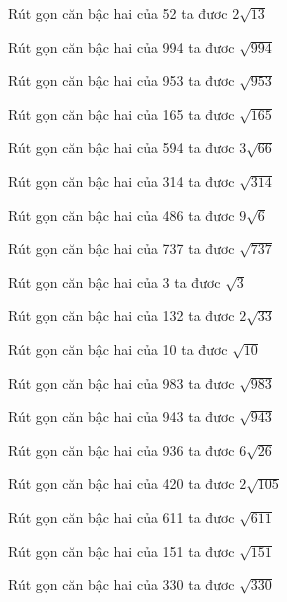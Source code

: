 \documentclass[12pt,a4paper]{article}
\begin{document}
\begin{ex}
Rút gọn căn bậc hai của 52 ta đươc $2\sqrt{13}$
\end{ex}
\begin{ex}
Rút gọn căn bậc hai của 994 ta đươc $\sqrt{994}$
\end{ex}
\begin{ex}
Rút gọn căn bậc hai của 953 ta đươc $\sqrt{953}$
\end{ex}
\begin{ex}
Rút gọn căn bậc hai của 165 ta đươc $\sqrt{165}$
\end{ex}
\begin{ex}
Rút gọn căn bậc hai của 594 ta đươc $3\sqrt{66}$
\end{ex}
\begin{ex}
Rút gọn căn bậc hai của 314 ta đươc $\sqrt{314}$
\end{ex}
\begin{ex}
Rút gọn căn bậc hai của 486 ta đươc $9\sqrt{6}$
\end{ex}
\begin{ex}
Rút gọn căn bậc hai của 737 ta đươc $\sqrt{737}$
\end{ex}
\begin{ex}
Rút gọn căn bậc hai của 3 ta đươc $\sqrt{3}$
\end{ex}
\begin{ex}
Rút gọn căn bậc hai của 132 ta đươc $2\sqrt{33}$
\end{ex}
\begin{ex}
Rút gọn căn bậc hai của 10 ta đươc $\sqrt{10}$
\end{ex}
\begin{ex}
Rút gọn căn bậc hai của 983 ta đươc $\sqrt{983}$
\end{ex}
\begin{ex}
Rút gọn căn bậc hai của 943 ta đươc $\sqrt{943}$
\end{ex}
\begin{ex}
Rút gọn căn bậc hai của 936 ta đươc $6\sqrt{26}$
\end{ex}
\begin{ex}
Rút gọn căn bậc hai của 420 ta đươc $2\sqrt{105}$
\end{ex}
\begin{ex}
Rút gọn căn bậc hai của 611 ta đươc $\sqrt{611}$
\end{ex}
\begin{ex}
Rút gọn căn bậc hai của 151 ta đươc $\sqrt{151}$
\end{ex}
\begin{ex}
Rút gọn căn bậc hai của 330 ta đươc $\sqrt{330}$
\end{ex}
\end{document}
